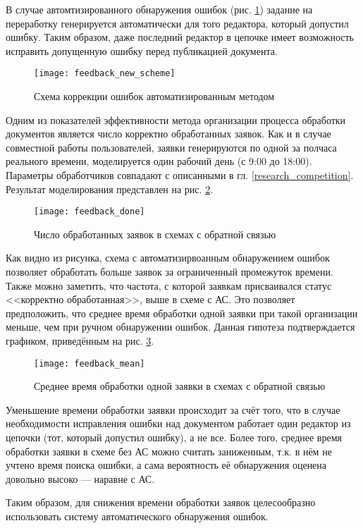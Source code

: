 \vspace{\baselineskip}
В случае автомтизированного обнаружения ошибок (рис. \ref{img:feedback_new_scheme}) задание на переработку генерируется автоматически для того редактора, который допустил ошибку. Таким образом, даже последний редактор в цепочке имеет возможность исправить допущенную ошибку перед публикацией документа.

\begin{figure}[h!]
  \centering
  \texttt{[image: feedback\_new\_scheme]}
  \caption{Схема коррекции ошибок автоматизированным методом}
  \label{img:feedback_new_scheme}
\end{figure}

\vspace{\baselineskip}
Одним из показателей эффективности метода организации процесса обработки документов является число корректно обработанных заявок. Как и в случае совместной работы пользователей, заявки генерируются по одной за полчаса реального времени, моделируется один рабочий день (с 9:00 до 18:00). Параметры обработчиков совпадают с описанными в гл. \ref{research_competition}. Результат моделирования представлен на рис. \ref{img:feedback_done}.

\begin{figure}[h!]
  \centering
  \texttt{[image: feedback\_done]}
  \caption{Число обработанных заявок в схемах с обратной связью}
  \label{img:feedback_done}
\end{figure}

\vspace{\baselineskip}
Как видно из рисунка, схема с автоматизирвоанным обнаружением ошибок позволяет обработать больше заявок за ограниченный промежуток времени. Также можно заметить, что частота, с которой заявкам присваивался статус <<корректно обработанная>>, выше в схеме с АС. Это позволяет предположить, что среднее время обработки одной заявки при такой организации меньше, чем при ручном обнаружении ошибок. Данная гипотеза подтверждается графиком, приведённым на рис. \ref{img:feedback_mean}.

\begin{figure}[h!]
  \centering
  \texttt{[image: feedback\_mean]}
  \caption{Среднее время обработки одной заявки в схемах с обратной связью}
  \label{img:feedback_mean}
\end{figure}

\vspace{\baselineskip}
Уменьшение времени обработки заявки происходит за счёт того, что в случае необходимости исправления ошибки над документом работает один редактор из цепочки (тот, который допустил ошибку), а не все. Более того, среднее время обработки заявки в схеме без АС можно считать заниженным, т.к. в нём не учтено время поиска ошибки, а сама вероятность её обнаружения оценена довольно высоко --- наравне с АС. 

\vspace{\baselineskip}
Таким образом, для снижения времени обработки заявок целесообразно использовать систему автоматического обнаружения ошибок.